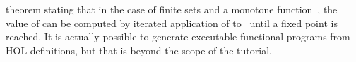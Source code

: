 \begin{isabellebody}
\begin{isamarkuptext}
theorem stating that in the case of finite sets and a monotone
function~, the value of \mbox{} can be computed by
iterated application of  to~ until a fixed point is
reached. It is actually possible to generate executable functional programs
from HOL definitions, but that is beyond the scope of the tutorial.%
%
\end{isamarkuptext}%
\isamarkuptrue%
%
\isadelimtheory
%
\endisadelimtheory
%
\isatagtheory
%
\endisatagtheory
{\isafoldtheory}%
%
\isadelimtheory
%
\endisadelimtheory
\end{isabellebody}%
